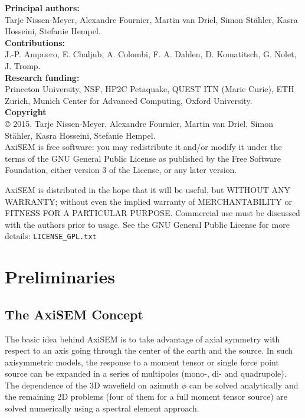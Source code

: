 \documentclass{article}
\begin{document}
%
\noindent \textbf{Principal authors:} \\
Tarje Nissen-Meyer, Alexandre
Fournier, Martin van Driel, Simon St\"{a}hler, Kasra Hosseini, Stefanie Hempel.\vspace*{0.3cm}\\
\noindent \textbf{Contributions:}\\
 J.-P. Ampuero, E. Chaljub, A. Colombi, F. A. Dahlen, D. Komatitsch,
 G. Nolet, J. Tromp.\vspace*{0.3cm}\\
\noindent \textbf{Research funding:} \\Princeton University, NSF, HP2C Petaquake, 
QUEST ITN (Marie Curie), ETH Zurich, Munich Center for Advanced Computing, 
Oxford University.\vspace*{0.3cm}\\
%
\noindent \textbf{Copyright}\\
\copyright  \hspace*{0.1cm} 
2015, Tarje Nissen-Meyer,
Alexandre Fournier, Martin van Driel, Simon St\"{a}hler, Kasra Hosseini, Stefanie Hempel.\vspace*{0.3cm}\\

AxiSEM is free software: you may redistribute it and/or modify it
under the terms of the GNU General Public License as published by the
Free Software Foundation, either version 3 of the License, or any
later version.

AxiSEM is distributed in the hope that it will be useful, but WITHOUT
ANY WARRANTY; without even the implied warranty of MERCHANTABILITY or
FITNESS FOR A PARTICULAR PURPOSE. Commercial use must be discussed
with the authors prior to usage. See the GNU General Public License
for more details: \verb|LICENSE_GPL.txt|
\newpage
\tableofcontents
%
\newpage

\section{Preliminaries}

\subsection{The AxiSEM Concept}

The basic idea behind AxiSEM is to take advantage of axial symmetry with respect
to an axis going through the center of the earth and the source. In such axisymmetric 
models, the response to a moment tensor or single force point source can be expanded in a
series of multipoles (mono-, di- and quadrupole). The dependence of the 3D wavefield on
azimuth $\phi$ can be solved analytically and the remaining 2D problems (four of them for
a full moment tensor source) are solved numerically using a spectral
element approach.\\
\end{document}

